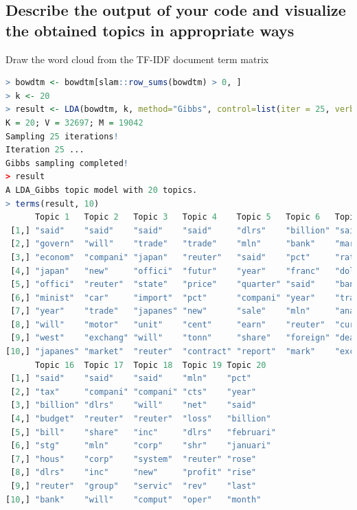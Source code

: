 \documentclass{article}
\begin{document}
\subsection{Describe the output of your code and visualize the obtained topics in appropriate ways}
Draw the word cloud from the TF-IDF document term matrix
\begin{lstlisting}[language=R]
  > bowdtm <- bowdtm[slam::row_sums(bowdtm) > 0, ]
> k <- 20
> result <- LDA(bowdtm, k, method="Gibbs", control=list(iter = 25, verbose = 25, alpha = 0.1))
K = 20; V = 32697; M = 19042
Sampling 25 iterations!
Iteration 25 ...
Gibbs sampling completed!
> result
A LDA_Gibbs topic model with 20 topics.
> terms(result, 10)
      Topic 1   Topic 2   Topic 3   Topic 4    Topic 5   Topic 6   Topic 7   Topic 8      Topic 9    Topic 10  Topic 11  Topic 12  Topic 13  Topic 14 Topic 15 
 [1,] "said"    "said"    "said"    "said"     "dlrs"    "billion" "said"    "tonn"       "bank"     "said"    "said"    "oil"     "said"    "pct"    "said"   
 [2,] "govern"  "will"    "trade"   "trade"    "mln"     "bank"    "market"  "said"       "said"     "share"   "reuter"  "said"    "export"  "will"   "share"  
 [3,] "econom"  "compani" "japan"   "reuter"   "said"    "pct"     "rate"    "mln"        "debt"     "compani" "mine"    "price"   "will"    "issu"   "stock"  
 [4,] "japan"   "new"     "offici"  "futur"    "year"    "franc"   "dollar"  "wheat"      "loan"     "stock"   "gold"    "gas"     "produc"  "said"   "compani"
 [5,] "offici"  "reuter"  "state"   "price"    "quarter" "said"    "bank"    "export"     "billion"  "reuter"  "will"    "barrel"  "price"   "mln"    "inc"    
 [6,] "minist"  "car"     "import"  "pct"      "compani" "year"    "trade"   "reuter"     "dlrs"     "court"   "compani" "product" "coffe"   "bond"   "dlrs"   
 [7,] "year"    "trade"   "japanes" "new"      "sale"    "mln"     "analyst" "agricultur" "will"     "offer"   "ton"     "mln"     "reuter"  "dlrs"   "offer"  
 [8,] "will"    "motor"   "unit"    "cent"     "earn"    "reuter"  "currenc" "year"       "interest" "file"    "oper"    "compani" "meet"    "rate"   "will"   
 [9,] "west"    "exchang" "will"    "tonn"     "share"   "foreign" "dealer"  "grain"      "countri"  "board"   "ounc"    "dlrs"    "countri" "reuter" "reuter" 
[10,] "japanes" "market"  "reuter"  "contract" "report"  "mark"    "exchang" "crop"       "new"      "inc"     "power"   "will"    "quota"   "manag"  "common" 
      Topic 16  Topic 17  Topic 18  Topic 19 Topic 20  
 [1,] "said"    "said"    "said"    "mln"    "pct"     
 [2,] "tax"     "compani" "compani" "cts"    "year"    
 [3,] "billion" "dlrs"    "will"    "net"    "said"    
 [4,] "budget"  "reuter"  "reuter"  "loss"   "billion" 
 [5,] "bill"    "share"   "inc"     "dlrs"   "februari"
 [6,] "stg"     "mln"     "corp"    "shr"    "januari" 
 [7,] "hous"    "corp"    "system"  "reuter" "rose"    
 [8,] "dlrs"    "inc"     "new"     "profit" "rise"    
 [9,] "reuter"  "group"   "servic"  "rev"    "last"    
[10,] "bank"    "will"    "comput"  "oper"   "month"  
\end{lstlisting}
\end{document}
